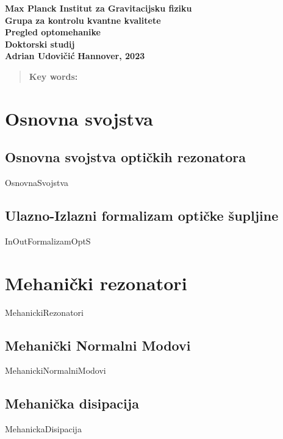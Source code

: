\documentclass[10pt]{article}
\begin{document}
\begin{titlepage}
	\begin{center}
		{\large \textbf{Max Planck Institut za Gravitacijsku fiziku}} \\[0.1cm]
		{\large \textbf{Grupa za kontrolu kvantne kvalitete}}\\[0.1cm]
		{\large \textbf{Pregled optomehanike}} \\[0.1cm]
		{\LARGE\textbf{Doktorski studij}}\\[2.5cm]
		\vspace{2cm}
		{\LARGE \textbf{Adrian Udovičić}}
		\vfill
		\large\textbf{{Hannover, 2023} }
	\end{center}
\end{titlepage}


\newpage
{}
\begin{abstract}
	\textbf{Key words:}
\end{abstract}
\newpage
\tableofcontents
\newpage

\section{Osnovna svojstva}
\subsection{Osnovna svojstva optičkih rezonatora}
{OsnovnaSvojstva}
\newpage
\subsection{Ulazno-Izlazni formalizam optičke šupljine}
{InOutFormalizamOptS}
\newpage
\section{Mehanički rezonatori}
{MehanickiRezonatori}
\subsection{Mehanički Normalni Modovi}
{MehanickiNormalniModovi}
\subsection{Mehanička disipacija}
{MehanickaDisipacija}
\newpage


\end{document}
